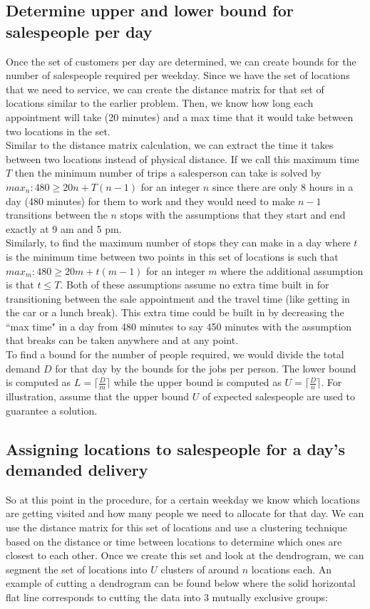 \documentclass{article}
\begin{document}
\subsection{Determine upper and lower bound for salespeople per day}
Once the set of customers per day are determined, we can create bounds for the number of salespeople required per weekday.  Since we have the set of locations that we need to service, we can create the distance matrix for that set of locations similar to the earlier problem.  Then, we know how long each appointment will take (20 minutes) and a max time that it would take between two locations in the set.\\

Similar to the distance matrix calculation, we can extract the time it takes between two locations instead of physical distance.  If we call this maximum time $T$ then the minimum number of trips a salesperson can take is solved by $max_n: 480 \geq 20n+T(n-1)$ for an integer $n$ since there are only 8 hours in a day (480 minutes) for them to work and they would need to make $n-1$ transitions between the $n$ stops with the assumptions that they start and end exactly at 9 am and 5 pm.\\

Similarly, to find the maximum number of stops they can make in a day where $t$ is the minimum time between two points in this set of locations is such that $max_m:480\geq 20m+t(m-1)$ for an integer $m$ where the additional assumption is that $t\leq T$.  Both of these assumptions assume no extra time built in for transitioning between the sale appointment and the travel time (like getting in the car or a lunch break). This extra time could be built in by decreasing the ``max time" in a day from 480 minutes to say 450 minutes with the assumption that breaks can be taken anywhere and at any point.\\

To find a bound for the number of people required, we would divide the total demand $D$ for that day by the bounds for the jobs per person.  The lower bound is computed as $L=\lceil\frac{D}{m}\rceil$ while the upper bound is computed as $U=\lceil\frac{D}{n}\rceil$.  For illustration, assume that the upper bound $U$ of expected salespeople are used to guarantee a solution.\\

\subsection{Assigning locations to salespeople for a day's demanded delivery}
So at this point in the procedure, for a certain weekday we know which locations are getting visited and how many people we need to allocate for that day.  We can use the distance matrix for this set of locations and use a clustering technique based on the distance or time between locations to determine which ones are closest to each other.  Once we create this set and look at the dendrogram, we can segment the set of locations into $U$ clusters of around $n$ locations each.  An example of cutting a dendrogram can be found below where the solid horizontal flat line corresponds to cutting the data into 3 mutually exclusive groups: \\
\end{document}
